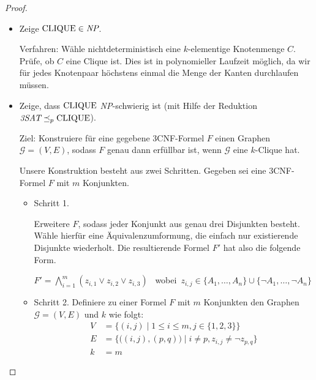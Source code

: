 \begin{proof}
    \
    \begin{itemize}
     \item Zeige $\operatorname{CLIQUE}\in \textit{NP}$.
     
     Verfahren: 
     Wähle nichtdeterministisch eine $k$-elementige Knotenmenge $C$.
     Prüfe, ob $C$ eine Clique ist.
     Dies ist in polynomieller Laufzeit möglich, da wir für jedes Knotenpaar höchstens einmal die Menge der Kanten durchlaufen müssen.
     
     \item Zeige, dass $\operatorname{CLIQUE}$ \textit{NP}-schwierig ist (mit Hilfe der Reduktion  $\textit{3SAT} \preceq_p \operatorname{CLIQUE}$).
     
     Ziel: Konstruiere für eine gegebene 3CNF-Formel $F$ einen Graphen $\mathcal{G}=(V,E)$, sodass $F$ genau dann erfüllbar ist, wenn $\mathcal{G}$ eine $k$-Clique hat.
     
     Unsere Konstruktion besteht aus zwei Schritten.
     Gegeben sei eine 3CNF-Formel $F$ mit $m$ Konjunkten.
     
     \begin{itemize}
      \item Schritt 1.
      
      Erweitere $F$, sodass jeder Konjunkt aus genau drei Disjunkten besteht.
      Wähle hierfür eine Äquivalenzumformung, die einfach nur existierende Disjunkte wiederholt.
      Die resultierende Formel $F'$ hat also die folgende Form.
      
      $F' = \bigwedge\limits_{i=1}^m (z_{i,1}\lor z_{i,2}\lor z_{i,3})$ \ wobei\ $z_{i,j}\in \{A_1,\dots,A_n\}\cup\{\neg A_1,\dots,\neg A_n\}$
      \item Schritt 2.
       Definiere zu einer Formel $F$ mit $m$ Konjunkten den Graphen $\mathcal{G} = (V,E)$ und $k$ wie folgt:
	\begin{align*}
		V &= \{ (i,j) \mid 1\leq i\leq m, j\in\{1,2,3\} \}\\
		E &= \{\big((i,j),(p,q)\big) \mid i\neq p, z_{i,j}\neq\neg z_{p,q}\}\\
		k &= m
	\end{align*}
     \end{itemize}


\end{itemize}
\end{proof}
